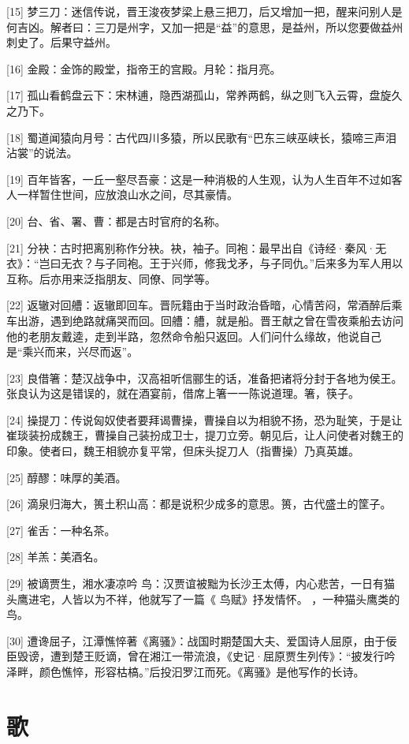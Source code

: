 \documentclass[12pt,UTF8]{ctexbook}
\begin{document}
[15] 梦三刀：迷信传说，晋王浚夜梦梁上悬三把刀，后又增加一把，醒来问别人是何吉凶。解者曰：三刀是州字，又加一把是“益”的意思，是益州，所以您要做益州刺史了。后果守益州。

[16] 金殿：金饰的殿堂，指帝王的宫殿。月轮：指月亮。

[17] 孤山看鹤盘云下：宋林逋，隐西湖孤山，常养两鹤，纵之则飞入云霄，盘旋久之乃下。

[18] 蜀道闻猿向月号：古代四川多猿，所以民歌有“巴东三峡巫峡长，猿啼三声泪沾裳”的说法。

[19] 百年皆客，一丘一壑尽吾豪：这是一种消极的人生观，认为人生百年不过如客人一样暂住世间，应放浪山水之间，尽其豪情。

[20] 台、省、署、曹：都是古时官府的名称。

[21] 分袂：古时把离别称作分袂。袂，袖子。同袍：最早出自《诗经·秦风·无衣》：“岂曰无衣？与子同袍。王于兴师，修我戈矛，与子同仇。”后来多为军人用以互称。后亦用来泛指朋友、同僚、同学等。

[22] 返辙对回艚：返辙即回车。晋阮籍由于当时政治昏暗，心情苦闷，常酒醉后乘车出游，遇到绝路就痛哭而回。回艚：艚，就是船。晋王献之曾在雪夜乘船去访问他的老朋友戴逵，走到半路，忽然命令船只返回。人们问什么缘故，他说自己是“乘兴而来，兴尽而返”。

[23] 良借箸：楚汉战争中，汉高祖听信郦生的话，准备把诸将分封于各地为侯王。张良认为这是错误的，就在酒宴前，借席上箸一一陈说道理。箸，筷子。

[24] 操提刀：传说匈奴使者要拜谒曹操，曹操自以为相貌不扬，恐为耻笑，于是让崔琰装扮成魏王，曹操自己装扮成卫士，提刀立旁。朝见后，让人问使者对魏王的印象。使者曰，魏王相貌亦复平常，但床头捉刀人（指曹操）乃真英雄。

[25] 醇醪：味厚的美酒。

[26] 滴泉归海大，篑土积山高：都是说积少成多的意思。篑，古代盛土的筐子。

[27] 雀舌：一种名茶。

[28] 羊羔：美酒名。

[29] 被谪贾生，湘水凄凉吟 鸟：汉贾谊被黜为长沙王太傅，内心悲苦，一日有猫头鹰进宅，人皆以为不祥，他就写了一篇《 鸟赋》抒发情怀。 ，一种猫头鹰类的鸟。

[30] 遭谗屈子，江潭憔悴著《离骚》：战国时期楚国大夫、爱国诗人屈原，由于佞臣毁谤，遭到楚王贬谪，曾在湘江一带流浪，《史记·屈原贾生列传》：“披发行吟泽畔，颜色憔悴，形容枯槁。”后投汩罗江而死。《离骚》是他写作的长诗。

\chapter{歌}
\end{document}
